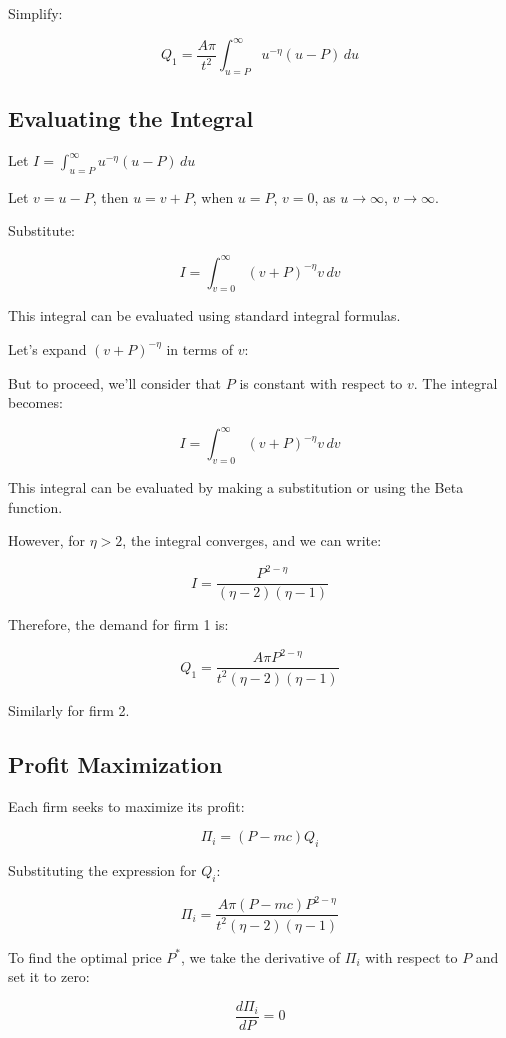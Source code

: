 Simplify:

\[
Q_1 = \frac{A \pi}{t^2} \int_{u = P}^{\infty} u^{-\eta} (u - P) \, du
\]

\subsection{Evaluating the Integral}

Let \( I = \int_{u = P}^{\infty} u^{-\eta} (u - P) \, du \)

Let \( v = u - P \), then \( u = v + P \), when \( u = P \), \( v = 0 \), as \( u \to \infty \), \( v \to \infty \).

Substitute:

\[
I = \int_{v = 0}^{\infty} (v + P)^{-\eta} v \, dv
\]

This integral can be evaluated using standard integral formulas.

Let’s expand \( (v + P)^{-\eta} \) in terms of \( v \):

But to proceed, we'll consider that \( P \) is constant with respect to \( v \). The integral becomes:

\[
I = \int_{v = 0}^{\infty} (v + P)^{-\eta} v \, dv
\]

This integral can be evaluated by making a substitution or using the Beta function.

However, for \( \eta > 2 \), the integral converges, and we can write:

\[
I = \frac{P^{2 - \eta}}{(\eta - 2)(\eta - 1)}
\]

Therefore, the demand for firm 1 is:

\[
Q_1 = \frac{A \pi P^{2 - \eta}}{t^2 (\eta - 2)(\eta - 1)}
\]

Similarly for firm 2.

\subsection{Profit Maximization}

Each firm seeks to maximize its profit:

\[
\Pi_i = (P - mc) Q_i
\]

Substituting the expression for \( Q_i \):

\[
\Pi_i = \frac{A \pi (P - mc) P^{2 - \eta}}{t^2 (\eta - 2)(\eta - 1)}
\]

To find the optimal price \( P^* \), we take the derivative of \( \Pi_i \) with respect to \( P \) and set it to zero:

\[
\frac{d\Pi_i}{dP} = 0
\]

